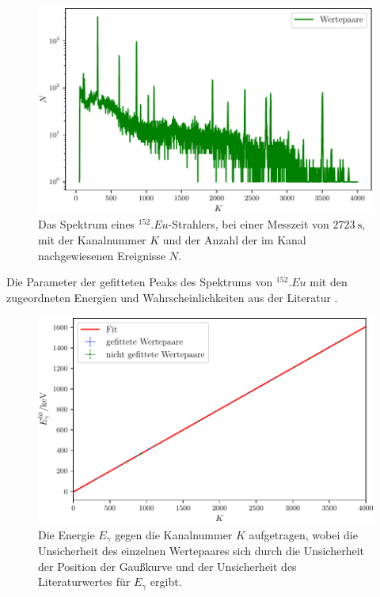 \begin{figure}
	\centering
	\includegraphics[width=\linewidth-60pt,height=\textheight-60pt,keepaspectratio]{content/images//EU152_1-4000.pdf}
	\caption{Das Spektrum eines $^{152}.{Eu}$-Strahlers, bei einer Messzeit von $\SI{2723}{\second}$, mit der Kanalnummer $K$ und der Anzahl der im Kanal nachgewiesenen Ereignisse $N$.}
	\label{fig:SpektrumEu}
\end{figure}

\begin{table}
	\centering
	\caption{Die Parameter der gefitteten Peaks des Spektrums von $^{152}.{Eu}$ mit den zugeordneten Energien und Wahrscheinlichkeiten aus der Literatur \cite{MARTIN20131497}.}
	
	\label{tab:parameterEu}
\end{table}

\begin{figure}
	\centering
	\includegraphics[width=\linewidth-60pt,height=\textheight-60pt,keepaspectratio]{content/images/EnergieKali.pdf}
	\caption{Die Energie $E_\gamma$ gegen die Kanalnummer $K$ aufgetragen, wobei die Unsicherheit des einzelnen Wertepaares sich durch die Unsicherheit der Position der Gaußkurve und der Unsicherheit des Literaturwertes für $E_\gamma$ ergibt.}
	\label{fig:Kalibrierung}
\end{figure}

